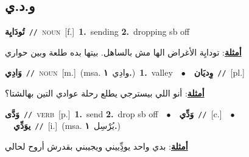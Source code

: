 \documentclass[10pt,a4paper,twoside]{article} %
\begin{document}
\begin{multicols}{2}
\vspace{-3mm}
\subsection*{\color{blue}\foreignlanguage{arabic}{و.د.ي}\color{blue}{}} 

{\setlength\topsep{0pt}\textbf{\foreignlanguage{arabic}{تُودَايِة}}\ {\color{gray}\texttt{//}\color{black}}\ \textsc{noun}\ [f.]\ \textbf{1.}~sending  \textbf{2.}~dropping sb off\  \begin{flushright}\color{gray}\foreignlanguage{arabic}{\textbf{\underline{\foreignlanguage{arabic}{أمثلة}}}: تودايِة الأغراض الها مش بالساهل. بيتها  بده طلعة وبين حواري}\end{flushright}\color{black}} \vspace{2mm}

{\setlength\topsep{0pt}\textbf{\foreignlanguage{arabic}{وَادِي}}\ {\color{gray}\texttt{//}\color{black}}\ \textsc{noun}\ [m.]\ \color{gray}(msa. \foreignlanguage{arabic}{وادِي}~\foreignlanguage{arabic}{\textbf{١.}})\color{black}\ \textbf{1.}~valley\ \ $\bullet$\ \ \setlength\topsep{0pt}\textbf{\foreignlanguage{arabic}{وِديَان}}\ {\color{gray}\texttt{//}\color{black}}\ [pl.]\  \begin{flushright}\color{gray}\foreignlanguage{arabic}{\textbf{\underline{\foreignlanguage{arabic}{أمثلة}}}: أنو اللي بيسترجي يطلع رحلة عوادي التين بهالشتا؟}\end{flushright}\color{black}} \vspace{2mm}

{\setlength\topsep{0pt}\textbf{\foreignlanguage{arabic}{وَدَّى}}\ {\color{gray}\texttt{//}\color{black}}\ \textsc{verb}\ [p.]\ \textbf{1.}~send  \textbf{2.}~drop sb off\ \ $\bullet$\ \ \setlength\topsep{0pt}\textbf{\foreignlanguage{arabic}{وَدِّي}}\ {\color{gray}\texttt{//}\color{black}}\ [c.]\ \ $\bullet$\ \ \setlength\topsep{0pt}\textbf{\foreignlanguage{arabic}{يوَدِّي}}\ {\color{gray}\texttt{//}\color{black}}\ [i.]\ \color{gray}(msa. \foreignlanguage{arabic}{يُرْسِل}~\foreignlanguage{arabic}{\textbf{١.}})\color{black}\  \begin{flushright}\color{gray}\foreignlanguage{arabic}{\textbf{\underline{\foreignlanguage{arabic}{أمثلة}}}: بدي واحد يودِِّييني ويجيبني بقدرش أروح لحالي}\end{flushright}\color{black}} \vspace{2mm}


\end{multicols}
\end{document}
